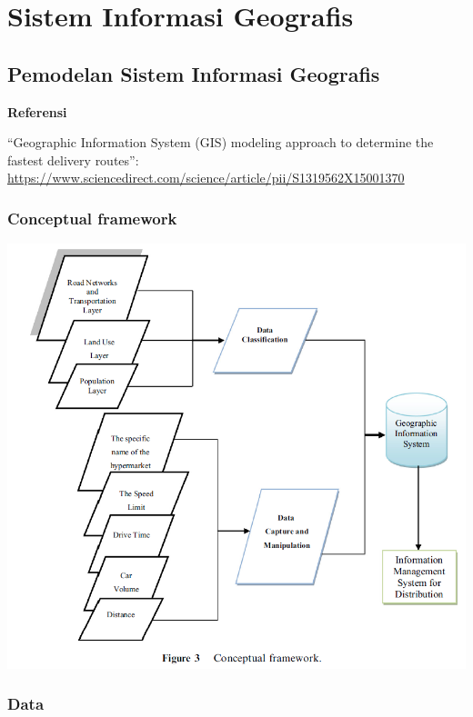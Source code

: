 \documentclass[]{book}
\begin{document}
\hypertarget{part-sistem-informasi-geografis}{%
\part{Sistem Informasi Geografis}\label{part-sistem-informasi-geografis}}

\hypertarget{pemodelan-sistem-informasi-geografis}{%
\chapter{Pemodelan Sistem Informasi Geografis}\label{pemodelan-sistem-informasi-geografis}}

\textbf{Referensi}

``Geographic Information System (GIS) modeling approach to determine the fastest delivery routes'': \url{https://www.sciencedirect.com/science/article/pii/S1319562X15001370}

\hypertarget{conceptual-framework}{%
\section{Conceptual framework}\label{conceptual-framework}}

\includegraphics{./img/gismodel1.png}

\hypertarget{data}{%
\section{Data}\label{data}}
\end{document}
